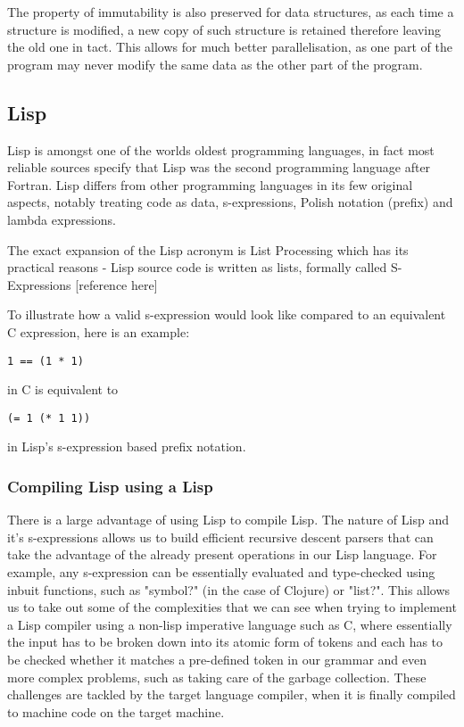 The property of immutability is also preserved for data structures, as each time a structure is modified, a new copy of such structure is retained therefore leaving the old one in tact. This allows for much better parallelisation, as one part of the program may never modify the same data as the other part of the program.

\subsection{Lisp}
Lisp is amongst one of the worlds oldest programming languages, in fact most reliable sources specify that Lisp was the second programming language after Fortran. Lisp differs from other programming languages in its few original aspects, notably treating code as data, s-expressions, Polish notation (prefix) and lambda expressions.

The exact expansion of the Lisp acronym is List Processing which has its practical reasons - Lisp source code is written as lists, formally called S-Expressions [reference here]

To illustrate how a valid s-expression would look like compared to an equivalent C expression, here is an example:

\begin{lstlisting}
1 == (1 * 1)
\end{lstlisting}
in C is equivalent to

\begin{lstlisting}
(= 1 (* 1 1))
\end{lstlisting}
in Lisp's s-expression based prefix notation.


\subsubsection{Compiling Lisp using a Lisp}
There is a large advantage of using Lisp to compile Lisp.
The nature of Lisp and it's s-expressions allows us to build efficient recursive descent parsers that can take the advantage of the already present operations in our Lisp language.
For example, any s-expression can be essentially evaluated and type-checked using inbuit functions, such as "symbol?" (in the case of Clojure) or "list?".
This allows us to take out some of the complexities that we can see when trying to implement a Lisp compiler using a non-lisp imperative language such as C, where essentially the input has to be broken down into its atomic form of tokens and each has to be checked whether it matches a pre-defined token in our grammar and even more complex problems, such as taking care of the garbage collection. These challenges are tackled by the target language compiler, when it is finally compiled to machine code on the target machine.

